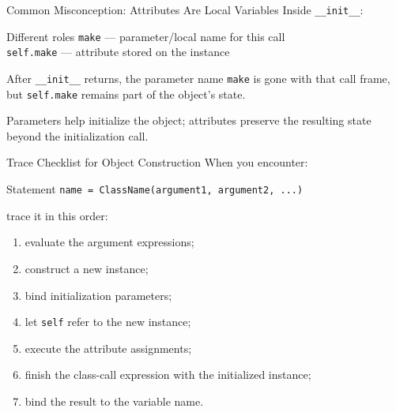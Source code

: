 \documentclass[aspectratio=169,10pt]{beamer}
\begin{document}
\begin{frame}{Common Misconception: Attributes Are Local Variables}
  Inside \texttt{\_\_init\_\_}:

  \begin{block}{Different roles}
    \texttt{make} --- parameter/local name for this call\\
    \texttt{self.make} --- attribute stored on the instance
  \end{block}

  After \texttt{\_\_init\_\_} returns, the parameter name \texttt{make} is gone with that call frame, but \texttt{self.make} remains part of the object's state.

  \begin{keyidea}
    Parameters help initialize the object; attributes preserve the resulting state beyond the initialization call.
  \end{keyidea}
\end{frame}

\begin{frame}{Trace Checklist for Object Construction}
  When you encounter:

  \begin{block}{Statement}
    \texttt{name = ClassName(argument1, argument2, ...)}
  \end{block}

  trace it in this order:

  \begin{enumerate}
    \item evaluate the argument expressions;
    \item construct a new instance;
    \item bind initialization parameters;
    \item let \texttt{self} refer to the new instance;
    \item execute the attribute assignments;
    \item finish the class-call expression with the initialized instance;
    \item bind the result to the variable name.
  \end{enumerate}
\end{frame}
\end{document}
